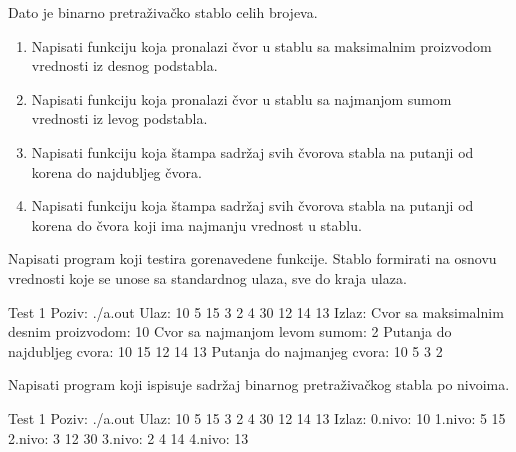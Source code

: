\begin{Answer}[ref=710]
\end{Answer}




\begin{Exercise}[label=711]
Dato je binarno pretraživačko stablo celih brojeva.
\begin{enumerate}
\item Napisati funkciju koja pronalazi čvor u stablu sa maksimalnim proizvodom vrednosti iz desnog podstabla.
\item Napisati funkciju koja pronalazi čvor u stablu sa najmanjom sumom vrednosti iz levog podstabla.
\item Napisati funkciju  koja štampa sadržaj svih čvorova stabla na putanji od korena do najdubljeg čvora.
\item Napisati funkciju koja štampa sadržaj svih čvorova stabla na putanji od korena do čvora koji ima najmanju vrednost u stablu.
\end{enumerate}
Napisati program koji testira gorenavedene funkcije. Stablo formirati na osnovu vrednosti koje se unose
sa standardnog ulaza, sve do kraja ulaza.


\begin{maxitest}
\begin{test}{Test 1}
Poziv: ./a.out
Ulaz: 
	10 5 15 3 2 4 30 12 14 13
Izlaz: 
	Cvor sa maksimalnim desnim proizvodom: 10
	Cvor sa najmanjom levom sumom: 2
	Putanja do najdubljeg cvora: 10 15 12 14 13
	Putanja do najmanjeg cvora: 10 5 3 2
\end{test}
\end{maxitest}
\end{Exercise}

\begin{Answer}[ref=711]
\end{Answer}


\begin{Exercise}[label=712]
Napisati program koji ispisuje sadržaj binarnog pretraživačkog stabla po nivoima. 

\begin{maxitest}
\begin{test}{Test 1}
Poziv: ./a.out
Ulaz: 
	10 5 15 3 2 4 30 12 14 13
Izlaz: 
	0.nivo: 10
	1.nivo: 5 15
	2.nivo: 3 12 30
	3.nivo: 2 4 14
	4.nivo: 13
\end{test}
\end{maxitest}

\end{Exercise}

